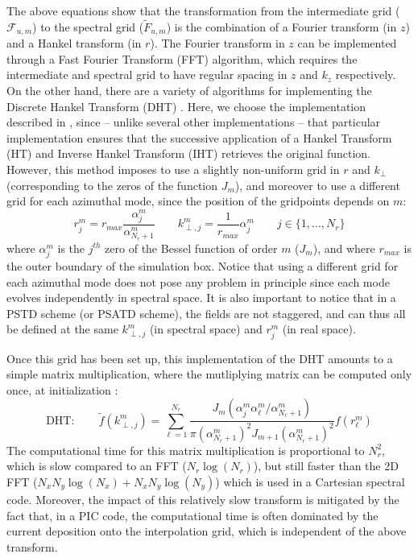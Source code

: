 \documentclass[a4paper]{article}   	%
\begin{document}
The above equations show that the transformation from the intermediate
grid ($\mathcal{F}_{u,m}$) to the spectral grid ($\tilde{F}_{u,m}$) is
the combination of a Fourier transform (in $z$) and a Hankel transform
(in $r$). The Fourier transform in $z$ can be implemented through a Fast Fourier
Transform (FFT) algorithm, which requires the intermediate and spectral grid to
have regular spacing in $z$ and $k_z$ respectively. On the other hand,
there are a variety of algorithms for implementing the Discrete Hankel Transform
(DHT) \cite{Cree,Siegman,Guizar}. Here, we choose the
implementation described in \cite{Guizar}, since -- unlike several other
implementations -- that particular implementation ensures that the
successive application of a Hankel Transform (HT) and
Inverse Hankel Transform (IHT)
retrieves the original function. However, this method imposes to use a
slightly non-uniform grid in $r$ and $k_\perp$ (corresponding to the
zeros of the function $J_m$), and moreover to use a
different grid for each azimuthal mode, since the position of the
gridpoints depends on $m$:
\[ r^m_j = r_{max} \frac{\alpha^m_j }{\alpha^m_{N_r+1}} \qquad
k_{\perp,j}^{m}  = \frac{1}{r_{max}} \alpha^{m}_j \qquad j \in \{1, ..., N_r \} \]
where $\alpha^{m}_j$ is the $j^{th}$ zero of the Bessel function of
order $m$ ($J_m$), and where $r_{max}$ is the outer boundary of the
simulation box. Notice that using a different grid for each azimuthal mode does
not pose any problem in principle since each mode evolves
independently in spectral space. It is also important to notice that
in a PSTD scheme (or PSATD scheme), the fields are not staggered, and
can thus all be defined at the same $k^{m}_{\perp,j}$ (in spectral
space) and $r^m_j$ (in real space).

Once this grid has been set up, this implementation of the DHT amounts
to a simple matrix multiplication, where the mutliplying matrix can be
computed only once, at initialization \cite{Guizar}:
\[ \mathrm{DHT :}\qquad  \tilde{f}(k^m_{\perp,j}) =
\sum_{\ell=1}^{N_r}
\frac{ J_{m}\left(\alpha^m_j \alpha^m_\ell /
      \alpha^m_{N_r+1}  \right) }{ \pi (\alpha^m_{N_r + 1})^2
    J_{m+1}(\alpha^m_{N_r + 1})^2 } f(r^m_\ell)\]
The computational time for this matrix multiplication is proportional
to $N_r^2$, which is slow compared to an FFT ($N_r \log(N_r)$), but
still faster than the 2D FFT ($N_x N_y \log(N_x) + N_x N_y \log(N_y) $)
which is used in a Cartesian spectral code. Moreover, the impact of
this relatively slow transform is mitigated by the fact that, in a PIC
code, the computational time is often dominated by the current deposition onto
the interpolation grid, which is independent of the above transform.
\end{document}
